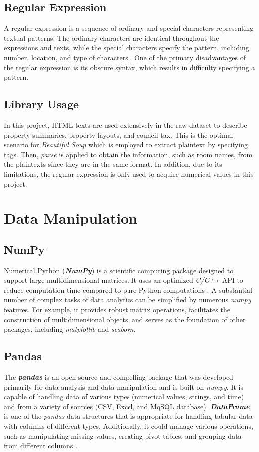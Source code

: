 \documentclass[12pt,twoside]{report}
\begin{document}
\subsection{Regular Expression}
A regular expression is a sequence of ordinary and special characters representing textual patterns. The ordinary characters are identical throughout the expressions and texts, while the special characters specify the pattern, including number, location, and type of characters  \citep{RN14}. One of the primary disadvantages of the regular expression is its obscure syntax, which results in difficulty specifying a pattern. 

\subsection{Library Usage}
In this project, HTML texts are used extensively in the raw dataset to describe property summaries, property layouts, and council tax. This is the optimal scenario for \textit{Beautiful Soup} which is employed to extract plaintext by specifying tags. Then, \textit{parse} is applied to obtain the information, such as room names, from the plaintexts since they are in the same format. In addition, due to its limitations, the regular expression is only used to acquire numerical values in this project. 


\section{Data Manipulation}
\subsection{NumPy}
Numerical Python (\textit{\textbf{NumPy}}) is a scientific computing package designed to support large multidimensional matrices. It uses an optimized \textit{C/C++} API to reduce computation time compared to pure Python computations \citep{RN6}. A substantial number of complex tasks of data analytics can be simplified by numerous \textit{numpy} features. For example, it provides robust matrix operations, facilitates the construction of multidimensional objects, and serves as the foundation of other packages, including \textit{matplotlib} and \textit{seaborn}.

\subsection{Pandas}
The \textbf{\textit{pandas}} is an open-source and compelling package that was developed primarily for data analysis and data manipulation and is built on \textit{numpy}. It is capable of handling data of various types (numerical values, strings, and time) and from a variety of sources (CSV, Excel, and MqSQL database). \textbf{\textit{DataFrame}} is one of the \textit{pandas} data structures that is appropriate for handling tabular data with columns of different types. Additionally, it could manage various operations, such as manipulating missing values, creating pivot tables, and grouping data from different columns \citep{RN4}. 
\end{document}
